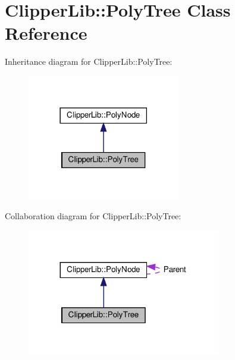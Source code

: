 \hypertarget{class_clipper_lib_1_1_poly_tree}{}\section{Clipper\+Lib\+:\+:Poly\+Tree Class Reference}
\label{class_clipper_lib_1_1_poly_tree}


Inheritance diagram for Clipper\+Lib\+:\+:Poly\+Tree\+:
\nopagebreak
\begin{figure}[H]
\begin{center}
\leavevmode
\includegraphics[width=189pt]{class_clipper_lib_1_1_poly_tree__inherit__graph}
\end{center}
\end{figure}


Collaboration diagram for Clipper\+Lib\+:\+:Poly\+Tree\+:
\nopagebreak
\begin{figure}[H]
\begin{center}
\leavevmode
\includegraphics[width=239pt]{class_clipper_lib_1_1_poly_tree__coll__graph}
\end{center}
\end{figure}
